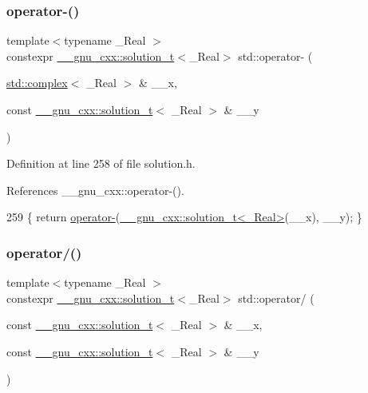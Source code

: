 \subsubsection{\texorpdfstring{operator-\/()}{operator-()}\hspace{0.1cm}{\footnotesize\ttfamily [6/6]}}
{\footnotesize\ttfamily template$<$typename \+\_\+\+Real $>$ \\
constexpr \hyperlink{namespace____gnu__cxx_ae20ea642de50eb361074c62676b0159c}{\+\_\+\+\_\+gnu\+\_\+cxx\+::solution\+\_\+t}$<$\+\_\+\+Real$>$ std\+::operator-\/ (\begin{DoxyParamCaption}\item[{\hyperlink{classstd_1_1complex}{std\+::complex}$<$ \+\_\+\+Real $>$ \&}]{\+\_\+\+\_\+x,  }\item[{const \hyperlink{namespace____gnu__cxx_ae20ea642de50eb361074c62676b0159c}{\+\_\+\+\_\+gnu\+\_\+cxx\+::solution\+\_\+t}$<$ \+\_\+\+Real $>$ \&}]{\+\_\+\+\_\+y }\end{DoxyParamCaption})}



Definition at line 258 of file solution.\+h.



References \+\_\+\+\_\+gnu\+\_\+cxx\+::operator-\/().


\begin{DoxyCode}
259     \{ \textcolor{keywordflow}{return} \hyperlink{namespacestd_a4f4e9391eaa235d953faa99bff006e3d}{operator-}(\hyperlink{namespace____gnu__cxx_ae20ea642de50eb361074c62676b0159c}{\_\_gnu\_cxx::solution\_t<\_Real>}(\_\_x), \_\_y); \}
\end{DoxyCode}
\mbox{\label{namespacestd_aea656103e37e932d00b9980288f00fac}} 
\subsubsection{\texorpdfstring{operator/()}{operator/()}\hspace{0.1cm}{\footnotesize\ttfamily [1/5]}}
{\footnotesize\ttfamily template$<$typename \+\_\+\+Real $>$ \\
constexpr \hyperlink{namespace____gnu__cxx_ae20ea642de50eb361074c62676b0159c}{\+\_\+\+\_\+gnu\+\_\+cxx\+::solution\+\_\+t}$<$\+\_\+\+Real$>$ std\+::operator/ (\begin{DoxyParamCaption}\item[{const \hyperlink{namespace____gnu__cxx_ae20ea642de50eb361074c62676b0159c}{\+\_\+\+\_\+gnu\+\_\+cxx\+::solution\+\_\+t}$<$ \+\_\+\+Real $>$ \&}]{\+\_\+\+\_\+x,  }\item[{const \hyperlink{namespace____gnu__cxx_ae20ea642de50eb361074c62676b0159c}{\+\_\+\+\_\+gnu\+\_\+cxx\+::solution\+\_\+t}$<$ \+\_\+\+Real $>$ \&}]{\+\_\+\+\_\+y }\end{DoxyParamCaption})}

